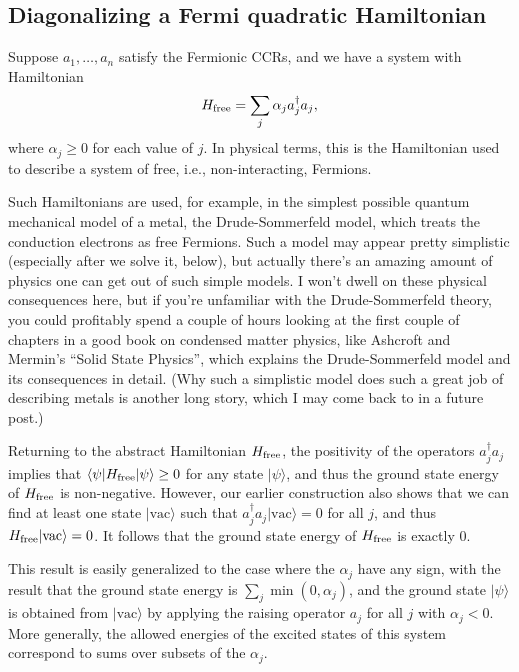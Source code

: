\documentclass[12pt]{article}
\begin{document}
{\subsection{Diagonalizing a Fermi quadratic Hamiltonian}

Suppose $a_1,\ldots,a_n$ satisfy the Fermionic CCRs, and we have a
system with Hamiltonian
\begin{eqnarray}
  H_{\rm free} = \sum_j \alpha_j a_j^\dagger a_j,
\end{eqnarray}
where $\alpha_j \geq 0$ for each value of $j$.  In physical terms,
this is the Hamiltonian used to describe a system of free, i.e.,
non-interacting, Fermions.  

Such Hamiltonians are used, for example, in the simplest possible
quantum mechanical model of a metal, the Drude-Sommerfeld model, which
treats the conduction electrons as free Fermions.  Such a model may
appear pretty simplistic (especially after we solve it, below), but
actually there's an amazing amount of physics one can get out of such
simple models.  I won't dwell on these physical consequences here, but
if you're unfamiliar with the Drude-Sommerfeld theory, you could
profitably spend a couple of hours looking at the first couple of
chapters in a good book on condensed matter physics, like Ashcroft and
Mermin's ``Solid State Physics'', which explains the Drude-Sommerfeld
model and its consequences in detail.  (Why such a simplistic model
does such a great job of describing metals is another long story,
which I may come back to in a future post.)

Returning to the abstract Hamiltonian $H_{\rm free}$, the positivity
of the operators $a_j^\dagger a_j$ implies that $\langle \psi |H_{\rm
  free} |\psi\rangle \geq 0$ for any state $|\psi\rangle$, and thus
the ground state energy of $H_{\rm free}$ is non-negative.  However,
our earlier construction also shows that we can find at least one
state $|\mbox{vac}\rangle$ such that $a_j^\dagger
a_j|\mbox{vac}\rangle = 0$ for all $j$, and thus $H_{\rm
  free}|\mbox{vac}\rangle = 0$.  It follows that the ground state
energy of $H_{\rm free}$ is exactly $0$.

This result is easily generalized to the case where the $\alpha_j$
have any sign, with the result that the ground state energy is $\sum_j
\min(0,\alpha_j)$, and the ground state $|\psi\rangle$ is obtained
from $|\mbox{vac}\rangle$ by applying the raising operator $a_j$ for
all $j$ with $\alpha_j < 0$. More generally, the allowed energies of
the excited states of this system correspond to sums over subsets of
the $\alpha_j$.

}
\end{document}
